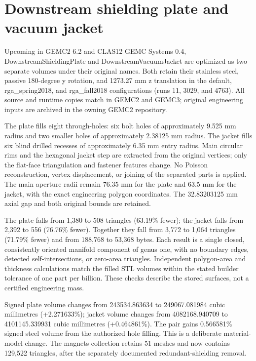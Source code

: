 \FloatBarrier
\section{Downstream shielding plate and vacuum jacket}
\label{sec:magnets-plate}

Upcoming in GEMC2 6.2 and CLAS12 GEMC Systems 0.4, DownstreamShieldingPlate and DownstreamVacuumJacket are
optimized as two separate volumes under their original names. Both retain their stainless steel, passive
180-degree y rotation, and 1273.27 mm z translation in the default, rga\_spring2018, and rga\_fall2018
configurations (runs 11, 3029, and 4763). All source and runtime copies match in GEMC2 and GEMC3; original
engineering inputs are archived in the owning GEMC2 repository.

The plate fills eight through-holes: six bolt holes of approximately 9.525 mm radius and two smaller holes of
approximately 2.38125 mm radius. The jacket fills six blind drilled recesses of approximately 6.35 mm entry
radius. Main circular rims and the hexagonal jacket step are extracted from the original vertices; only the
flat-face triangulation and fastener features change. No Poisson reconstruction, vertex displacement, or
joining of the separated parts is applied. The main aperture radii remain 76.35 mm for the plate and 63.5 mm
for the jacket, with the exact engineering polygon coordinates. The 32.83203125 mm axial gap and both original
bounds are retained.

The plate falls from 1,380 to 508 triangles (63.19\% fewer); the jacket falls from 2,392 to 556 (76.76\%
fewer). Together they fall from 3,772 to 1,064 triangles (71.79\% fewer) and from 188,768 to 53,368 bytes.
Each result is a single closed, consistently oriented manifold component of genus one, with no boundary edges,
detected self-intersections, or zero-area triangles. Independent polygon-area and thickness calculations match
the filled STL volumes within the stated builder tolerance of one part per billion. These checks describe the
stored surfaces, not a certified engineering mass.

Signed plate volume changes from 243534.863634 to 249067.081984 cubic millimetres (+2.271633\%); jacket volume
changes from 4082168.940709 to 4101145.339931 cubic millimetres (+0.464861\%). The pair gains 0.566581\%
signed steel volume from the authorized hole filling. This is a deliberate material-model change. The magnets
collection retains 51 meshes and now contains 129,522 triangles, after the separately documented
redundant-shielding removal.

